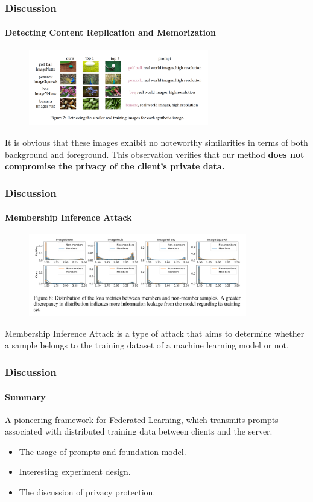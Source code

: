 \documentclass{beamer}
\begin{document}
\begin{frame}
\frametitle{Discussion}
\framesubtitle{Detecting Content Replication and Memorization}
	\begin{figure}
	\centering
	\includegraphics[width=0.7\textwidth]
	{assets/replication}
	\end{figure}
	It is obvious that these images exhibit no noteworthy similarities in terms of both background and
	foreground. This observation verifies that our method \textbf{does not compromise the privacy of the client's
	private data.}
\end{frame}

\begin{frame}
\frametitle{Discussion}
\framesubtitle{Membership Inference Attack}
	\begin{figure}
	\centering
	\includegraphics[width=0.85\textwidth]
	{assets/MIA}
	\end{figure}
	Membership Inference Attack is a type of attack that aims to determine whether a sample belongs to the training dataset of a machine learning model or not.
\end{frame}



\begin{frame}
\frametitle{Discussion}
\framesubtitle{Summary}
A pioneering framework for Federated Learning, which transmits prompts associated with distributed training data between clients and
the server.
\begin{itemize}
\item The usage of prompts and foundation model.
\item Interesting experiment design.
\item The discussion of privacy protection.
\end{itemize}
\end{frame}
\end{document}
